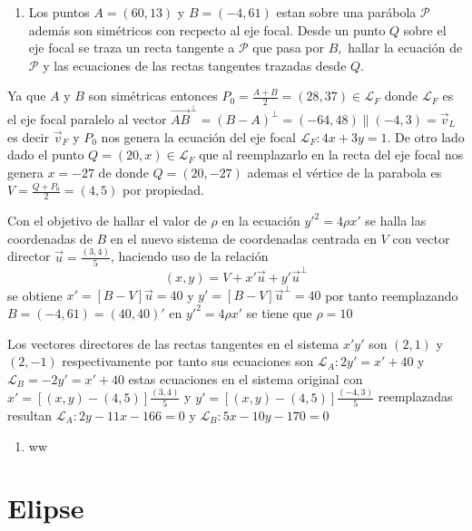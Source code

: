 \documentclass[12pt,]{report}
\providecommand{\tightlist}{%
  \setlength{\itemsep}{0pt}\setlength{\parskip}{0pt}}
\theoremstyle{definition}
\theoremstyle{definition}
\theoremstyle{definition}
\theoremstyle{remark}
\begin{document}
\begin{enumerate}
\def\labelenumi{\arabic{enumi}.}
\setcounter{enumi}{1}
\tightlist
\item
  Los puntos \(A=(60,13)\) y \(B=(-4,61)\) estan sobre una parábola \(\mathcal{P}\) además son simétricos con recpecto al eje focal. Desde un punto \(Q\) sobre el eje focal se traza un recta tangente a \(\mathcal{P}\) que pasa por \(B,\) hallar la ecuación de \(\mathcal{P}\) y las ecuaciones de las rectas tangentes trazadas desde \(Q\).
\end{enumerate}

Ya que \(A\) y \(B\) son simétricas entonces \(P_0=\frac{A+B}{2}=(28,37) \in \mathcal{L}_F\) donde \(\mathcal{L}_F\) es el eje focal paralelo al vector \(\vec{AB}^\perp=(B-A)^\perp=(-64,48)\parallel(-4,3)=\vec{v}_L\) es decir \(\vec{v}_F\) y \(P_0\) nos genera la ecuación del eje focal \(\mathcal{L}_F:4x+3y=1\). De otro lado dado el punto \(Q=(20,x)\in\mathcal{L}_F\) que al reemplazarlo en la recta del eje focal nos genera \(x=-27\) de donde \(Q=(20,-27)\) ademas el vértice de la parabola es \(V=\frac{Q+P_0}{2}=(4,5)\) por propiedad.

Con el objetivo de hallar el valor de \(\rho\) en la ecuación \(y'^2=4\rho x'\) se halla las coordenadas de \(B\) en el nuevo sistema de coordenadas centrada en \(V\) con vector director \(\vec{u}=\frac{(3,4)}{5}\), haciendo uso de la relación \[(x,y)=V+x'\vec{u}+y'\vec{u}^\perp\] se obtiene \(x'=\left[B-V\right]\vec{u}=40\) y \(y'=\left[B-V\right]\vec{u}^\perp=40\) por tanto reemplazando \(B=(-4,61)=(40,40)'\) en \(y'^2=4\rho x'\) se tiene que \(\rho=10\)

Los vectores directores de las rectas tangentes en el sistema \(x'y'\) son \((2,1)\) y \((2,-1)\) respectivamente por tanto sus ecuaciones son \(\mathcal{L}_A: 2y'=x'+40\) y \(\mathcal{L}_B=-2y'=x'+40\) estas ecuaciones en el sistema original con \(x'=\left[(x,y)-(4,5)\right]\frac{(3,4)}{5}\) y \(y'=\left[(x,y)-(4,5)\right]\frac{(-4,3)}{5}\) reemplazadas resultan \(\mathcal{L}_A:2y-11x-166=0\) y \(\mathcal{L}_B:5x-10y-170=0\)

\begin{enumerate}
\def\labelenumi{\arabic{enumi}.}
\tightlist
\item
  ww
\end{enumerate}

\hypertarget{elipse}{%
\chapter{Elipse}\label{elipse}}
\end{document}
